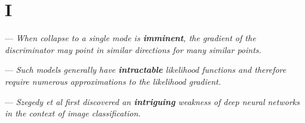 \section{I}

 --- \textit{When collapse to a single mode is \textbf{imminent}, the gradient of the discriminator may point in similar directions for many similar points.}


 --- \textit{Such models generally have \textbf{intractable} likelihood functions and therefore require numerous approximations to the likelihood gradient.}


 --- \textit{Szegedy et al first discovered an \textbf{intriguing} weakness of deep neural networks in the context of image classification.}

